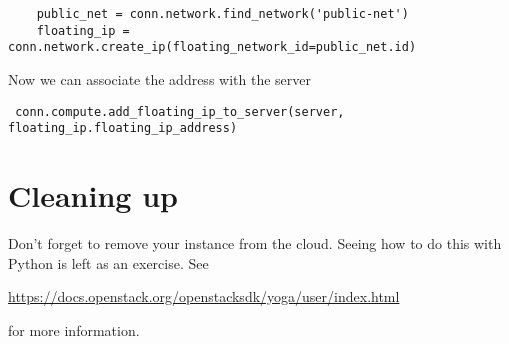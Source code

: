 \documentclass{article}
\begin{document}
\begin{verbatim}
    public_net = conn.network.find_network('public-net')
    floating_ip = conn.network.create_ip(floating_network_id=public_net.id) 
\end{verbatim}

Now we can associate the address with the server

\begin{verbatim}
 conn.compute.add_floating_ip_to_server(server, floating_ip.floating_ip_address)
\end{verbatim}

\section{Cleaning up}
Don't forget to remove your instance from the cloud. Seeing how to do this with Python is left as an exercise. See

\url{https://docs.openstack.org/openstacksdk/yoga/user/index.html}

for more information.
\end{document}
